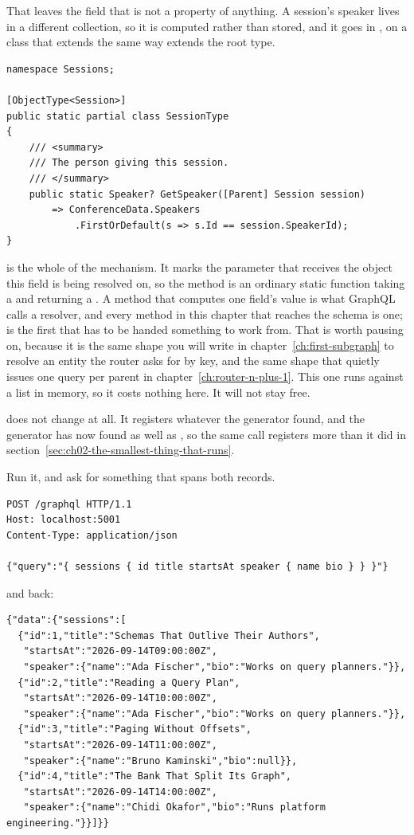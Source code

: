 %
That leaves the field that is not a property of anything. A session's speaker
lives in a different collection, so it is computed rather than stored, and it
goes in , on a class that extends  the same
way  extends the root type.

\begin{verbatim}
namespace Sessions;

[ObjectType<Session>]
public static partial class SessionType
{
    /// <summary>
    /// The person giving this session.
    /// </summary>
    public static Speaker? GetSpeaker([Parent] Session session)
        => ConferenceData.Speakers
            .FirstOrDefault(s => s.Id == session.SpeakerId);
}
\end{verbatim}

%
%
\code{[Parent]} is the whole of the mechanism. It marks the parameter that
receives the object this field is being resolved on, so the method is an
ordinary static function taking a  and returning a
.
A method that computes one field's value is what GraphQL calls a resolver,
and every method in this chapter that reaches the schema is one;
 is the first that has to be handed something to work from.
That is worth pausing on, because it is the same shape you will
write in chapter~\ref{ch:first-subgraph} to resolve an entity the router asks
for by key, and the same shape that quietly issues one query per parent in
chapter~\ref{ch:router-n-plus-1}. This one runs against a list in memory, so it
costs nothing here. It will not stay free.

 does not change at all. It registers whatever the generator
found, and the generator has now found  as well as
, so the same call registers more than it did in
section~\ref{sec:ch02-the-smallest-thing-that-runs}.

Run it, and ask for something that spans both records.

\begin{verbatim}
POST /graphql HTTP/1.1
Host: localhost:5001
Content-Type: application/json

{"query":"{ sessions { id title startsAt speaker { name bio } } }"}
\end{verbatim}

and back:

\begin{verbatim}
{"data":{"sessions":[
  {"id":1,"title":"Schemas That Outlive Their Authors",
   "startsAt":"2026-09-14T09:00:00Z",
   "speaker":{"name":"Ada Fischer","bio":"Works on query planners."}},
  {"id":2,"title":"Reading a Query Plan",
   "startsAt":"2026-09-14T10:00:00Z",
   "speaker":{"name":"Ada Fischer","bio":"Works on query planners."}},
  {"id":3,"title":"Paging Without Offsets",
   "startsAt":"2026-09-14T11:00:00Z",
   "speaker":{"name":"Bruno Kaminski","bio":null}},
  {"id":4,"title":"The Bank That Split Its Graph",
   "startsAt":"2026-09-14T14:00:00Z",
   "speaker":{"name":"Chidi Okafor","bio":"Runs platform engineering."}}]}}
\end{verbatim}

